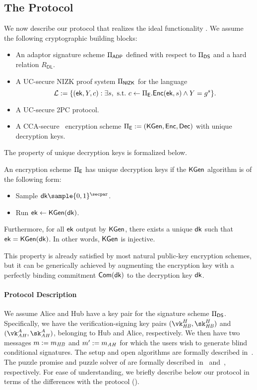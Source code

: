 \subsection{The \aaluc Protocol}\label{sec:our_protocol}

We now describe our protocol \aaluc that realizes the ideal functionality \flocks.
We assume the following cryptographic building blocks:
\begin{itemize}
    \item An adaptor signature scheme $\Pi_{\mathsf{ADP}}$ defined with respect to $\Pi_{\mathsf{DS}}$ and a hard relation $R_\mathsf{DL}$.
    \item A UC-secure NIZK proof system $\Pi_{\mathsf{NIZK}}$ for the language $$\mathcal{L} := \{ (\mathsf{ek}, Y,c) : \exists s, \mathrm{~s.t.~} c \gets \Pi_{\mathsf{E}}.{\mathsf{Enc}}(\mathsf{ek}, s) \land Y = g^s \}. $$ 
    \item A UC-secure 2PC protocol.
    \item A CCA-secure~\cite{STOC:GolMic82} encryption scheme $\Pi_{\mathsf{E}} := ({\mathsf{KGen}}, {\mathsf{Enc}}, {\mathsf{Dec}})$ with unique decryption keys.
\end{itemize}
The property of unique decryption keys is formalized below.
\begin{definition}
An encryption scheme $\Pi_{\mathsf{E}}$ has unique decryption keys if the ${\mathsf{KGen}}$ algorithm is of the following form:
\begin{itemize}
    \item Sample $\dk \sample \{0,1\}^\secpar$.
    \item Run $\mathsf{ek} \gets {\mathsf{KGen}}(\mathsf{dk})$.
\end{itemize}
Furthermore, for all $\mathsf{ek}$ output by ${\mathsf{KGen}}$, there exists a unique $\mathsf{dk}$ such that $\mathsf{ek} = {\mathsf{KGen}}(\mathsf{dk})$. In other words, ${\mathsf{KGen}}$ is injective.
\end{definition}
This property is already satisfied by most natural public-key encryption schemes, but it can be generically achieved by augmenting the encryption key with a perfectly binding commitment $\mathsf{Com}(\mathsf{dk})$ to the decryption key $\mathsf{dk}$.

\paragraph{Protocol Description} We assume Alice and Hub have a key pair for the signature scheme $\Pi_{\mathsf{DS}}$. Specifically, we have the verification-signing key pairs $(\vk_\hb^H, \sk_\hb^H)$ and $(\vk_\ah^A, \sk_\ah^A)$, belonging to Hub and Alice, respectively.
We then have two messages $m := m_{\mathit{HB}}$ and $m' := m_{\mathit{AH}}$ for which the users wish to generate blind conditional signatures.
The setup and open algorithms are formally described in~. The puzzle promise and puzzle solver of \aaluc are formally described in~ and~, respectively.
For ease of understanding, we briefly describe below our \aaluc protocol in terms of the differences with the \aal protocol ().

